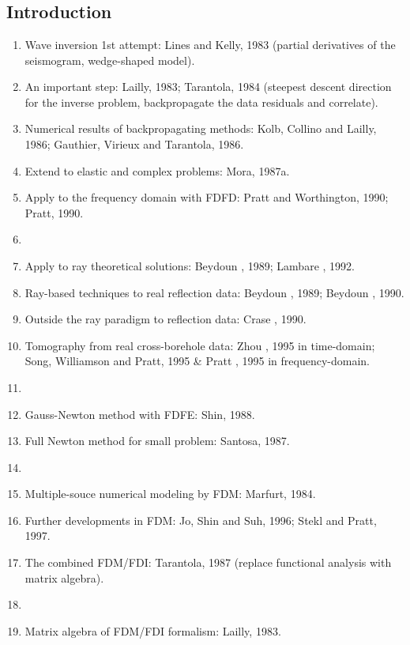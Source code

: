 \renewcommand{\pmk}{Pratt\_1997\_GJI\_Newton methods}
\renewcommand{\prf}{FWI/\pmk.pdf}
\renewcommand{\pti}{Gauss-Newton and full Newton methods
in frequency-space seismic waveform inversion}
\renewcommand{\pay}{R. G. Pratt, C. Shin and G. J. Hicks, 1997}
\renewcommand{\pjo}{Geophys. J. Int.}
\renewcommand{\pda}{2016/9/3 Sun.}

\section{\pinfo}
\subsection{Introduction}
\begin{enumerate}[\hspace{10mm}*]
  \item Wave inversion 1st attempt: Lines and Kelly, 1983
    (partial derivatives of the seismogram, wedge-shaped model).
  \item An important step: Lailly, 1983; Tarantola, 1984
    (steepest descent direction for the inverse problem,
    backpropagate the data residuals and correlate).
  \item Numerical results of backpropagating methods:
    Kolb, Collino and Lailly, 1986; Gauthier, Virieux and Tarantola, 1986.
  \item Extend to elastic and complex problems: Mora, 1987a.
  \item Apply to the frequency domain with FDFD: Pratt and Worthington, 1990; Pratt, 1990.
  \item \sline
  \item Apply to ray theoretical solutions: Beydoun \etal, 1989; Lambare \etal, 1992.
  \item Ray-based techniques to real reflection data: Beydoun \etal, 1989; Beydoun \etal, 1990.
  \item Outside the ray paradigm to reflection data: Crase \etal, 1990.
  \item Tomography from real cross-borehole data: Zhou \etal, 1995 in time-domain;
    Song, Williamson and Pratt, 1995 \& Pratt \etal, 1995 in frequency-domain.
  \item \sline
  \item Gauss-Newton method with FDFE: Shin, 1988.
  \item Full Newton method for small problem: Santosa, 1987.
  \item \sline
  \item Multiple-souce numerical modeling by FDM: Marfurt, 1984.
  \item Further developments in FDM: Jo, Shin and Suh, 1996; Stekl and Pratt, 1997.
  \item The combined FDM/FDI: Tarantola, 1987 (replace functional analysis with matrix algebra).
  \item \sline
  \item Matrix algebra of FDM/FDI formalism: Lailly, 1983.
\end{enumerate}

